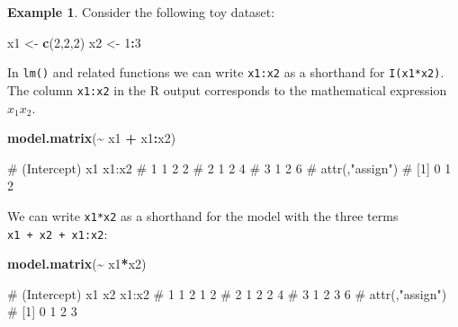 \documentclass[
  a4paper,
]{article}
\newenvironment{Shaded}{\begin{snugshade}}{\end{snugshade}}
\newcommand{\DecValTok}[1]{\textcolor[rgb]{0.00,0.00,0.81}{#1}}
\newcommand{\FunctionTok}[1]{\textcolor[rgb]{0.13,0.29,0.53}{\textbf{#1}}}
\newcommand{\NormalTok}[1]{#1}
\newcommand{\OtherTok}[1]{\textcolor[rgb]{0.56,0.35,0.01}{#1}}
\newcommand{\SpecialCharTok}[1]{\textcolor[rgb]{0.81,0.36,0.00}{\textbf{#1}}}
\theoremstyle{definition}
\theoremstyle{definition}
\newtheorem{example}{Example}[section]
\theoremstyle{definition}
\theoremstyle{definition}
\theoremstyle{remark}
\begin{document}
\begin{example}

Consider the following toy dataset:

\begin{Shaded}
\begin{Highlighting}[]
\NormalTok{x1 }\OtherTok{\textless{}{-}} \FunctionTok{c}\NormalTok{(}\DecValTok{2}\NormalTok{,}\DecValTok{2}\NormalTok{,}\DecValTok{2}\NormalTok{)}
\NormalTok{x2 }\OtherTok{\textless{}{-}} \DecValTok{1}\SpecialCharTok{:}\DecValTok{3}
\end{Highlighting}
\end{Shaded}

In \texttt{lm()} and related functions we can write \texttt{x1:x2} as a shorthand
for \texttt{I(x1*x2)}. The column \texttt{x1:x2} in the R output corresponds
to the mathematical expression \(x_1 x_2\).

\begin{Shaded}
\begin{Highlighting}[]
\FunctionTok{model.matrix}\NormalTok{(}\SpecialCharTok{\textasciitilde{}}\NormalTok{ x1 }\SpecialCharTok{+}\NormalTok{ x1}\SpecialCharTok{:}\NormalTok{x2)}
\end{Highlighting}
\end{Shaded}

\begin{Shaded}
\begin{Highlighting}[]
\NormalTok{\#   (Intercept) x1 x1:x2}
\NormalTok{\# 1           1  2     2}
\NormalTok{\# 2           1  2     4}
\NormalTok{\# 3           1  2     6}
\NormalTok{\# attr(,"assign")}
\NormalTok{\# [1] 0 1 2}
\end{Highlighting}
\end{Shaded}

We can write \texttt{x1*x2} as a shorthand for the model with the
three terms \texttt{x1\ +\ x2\ +\ x1:x2}:

\begin{Shaded}
\begin{Highlighting}[]
\FunctionTok{model.matrix}\NormalTok{(}\SpecialCharTok{\textasciitilde{}}\NormalTok{ x1}\SpecialCharTok{*}\NormalTok{x2)}
\end{Highlighting}
\end{Shaded}

\begin{Shaded}
\begin{Highlighting}[]
\NormalTok{\#   (Intercept) x1 x2 x1:x2}
\NormalTok{\# 1           1  2  1     2}
\NormalTok{\# 2           1  2  2     4}
\NormalTok{\# 3           1  2  3     6}
\NormalTok{\# attr(,"assign")}
\NormalTok{\# [1] 0 1 2 3}
\end{Highlighting}
\end{Shaded}

\end{example}
\end{document}
